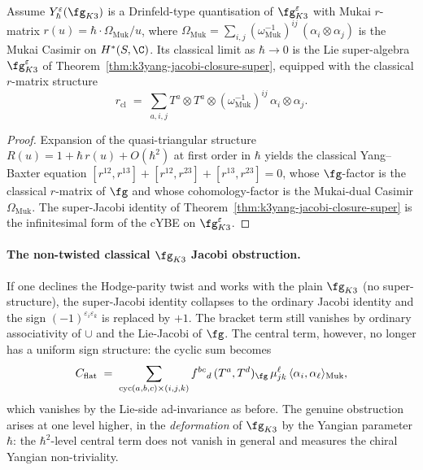 \begin{corollary}
\label{cor:k3yang-twisted-classical-limit}
Assume $Y^{\varepsilon}_\hbar(\fg_{K3})$ is a Drinfeld-type
quantisation of $\fg^{\varepsilon}_{K3}$ with Mukai $r$-matrix
$r(u) = \hbar \cdot \Omega_{\mathrm{Muk}}/u$, where
$\Omega_{\mathrm{Muk}}
 = \sum_{i, j}
 (\omega_{\mathrm{Muk}}^{-1})^{ij}\,
 (\alpha_i \otimes \alpha_j)$
is the Mukai Casimir on $H^*(S, \C)$. Its classical limit as
$\hbar \to 0$ is the Lie super-algebra $\fg^{\varepsilon}_{K3}$ of
Theorem~\ref{thm:k3yang-jacobi-closure-super}, equipped with the
classical $r$-matrix structure
\[
 r_{\mathrm{cl}}
 \;=\; \sum_{a, i, j}
 T^a \otimes T^a \otimes
 (\omega_{\mathrm{Muk}}^{-1})^{ij}\,
 \alpha_i \otimes \alpha_j.
\]
\end{corollary}

\begin{proof}
Expansion of the quasi-triangular structure
$R(u) = 1 + \hbar\, r(u) + O(\hbar^2)$ at first order in $\hbar$
yields the classical Yang--Baxter equation
$[r^{12}, r^{13}] + [r^{12}, r^{23}] + [r^{13}, r^{23}] = 0$, whose
$\fg$-factor is the classical $r$-matrix of $\fg$ and whose
cohomology-factor is the Mukai-dual Casimir
$\Omega_{\mathrm{Muk}}$. The super-Jacobi identity of
Theorem~\ref{thm:k3yang-jacobi-closure-super} is the infinitesimal
form of the cYBE on $\fg^{\varepsilon}_{K3}$.
\end{proof}

\paragraph{The non-twisted classical \texorpdfstring{$\fg_{K3}$}{g-K3} Jacobi obstruction.}
If one declines the Hodge-parity twist and works with the plain
$\fg_{K3}$ (no super-structure), the super-Jacobi identity collapses
to the ordinary Jacobi identity and the sign
$(-1)^{\varepsilon_i \varepsilon_k}$ is replaced by $+1$. The
bracket term still vanishes by ordinary associativity of $\cup$
and the Lie-Jacobi of $\fg$. The central term, however, no longer
has a uniform sign structure: the cyclic sum becomes
\[
 C_{\mathrm{flat}} \;=\;
 \sum_{\mathrm{cyc}(a, b, c) \times (i, j, k)}
 f^{bc}{}_d\, (T^a, T^d)_{\fg}\,
 \mu^\ell_{jk}\,
 \langle \alpha_i, \alpha_\ell\rangle_{\mathrm{Muk}},
\]
which vanishes by the Lie-side ad-invariance as before. The
genuine obstruction arises at one level higher, in the
\emph{deformation} of $\fg_{K3}$ by the Yangian parameter $\hbar$:
the $\hbar^2$-level central term does not vanish in general and
measures the chiral Yangian non-triviality.

